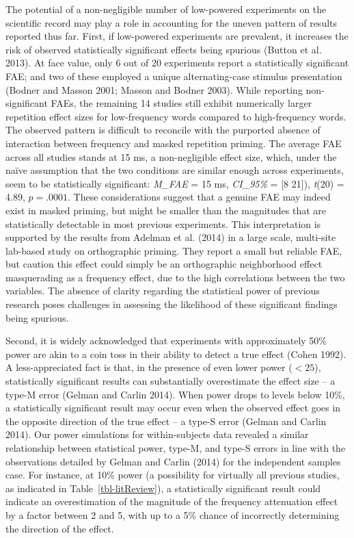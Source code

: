 \documentclass[
]{interact}
\begin{document}
The potential of a non-negligible number of low-powered experiments on
the scientific record may play a role in accounting for the uneven
pattern of results reported thus far. First, if low-powered experiments
are prevalent, it increases the risk of observed statistically
significant effects being spurious (Button et al. 2013). At face value,
only 6 out of 20 experiments report a statistically significant FAE; and
two of these employed a unique alternating-case stimulus presentation
(Bodner and Masson 2001; Masson and Bodner 2003). While reporting
non-significant FAEs, the remaining 14 studies still exhibit numerically
larger repetition effect sizes for low-frequency words compared to
high-frequency words. The observed pattern is difficult to reconcile
with the purported absence of interaction between frequency and masked
repetition priming. The average FAE across all studies stands at 15 ms,
a non-negligible effect size, which, under the naïve assumption that the
two conditions are similar enough across experiments, seem to be
statistically significant: \emph{M\_FAE} = 15 ms, \emph{CI\_95\%} = {[}8
21{]}), \emph{t}(20) = 4.89, \(p=.0001\). These considerations suggest
that a genuine FAE may indeed exist in masked priming, but might be
smaller than the magnitudes that are statistically detectable in most
previous experiments. This interpretation is supported by the results
from Adelman et al. (2014) in a large scale, multi-site lab-based study
on orthographic priming. They report a small but reliable FAE, but
caution this effect could simply be an orthographic neighborhood effect
masquerading as a frequency effect, due to the high correlations between
the two variables. The absence of clarity regarding the statistical
power of previous research poses challenges in assessing the likelihood
of these significant findings being spurious.

Second, it is widely acknowledged that experiments with approximately
50\% power are akin to a coin toss in their ability to detect a true
effect (Cohen 1992). A less-appreciated fact is that, in the presence of
even lower power (\(<25%
\)), statistically significant results can substantially overestimate
the effect size -- a type-M error (Gelman and Carlin 2014). When power
drops to levels below 10\%, a statistically significant result may occur
even when the observed effect goes in the opposite direction of the true
effect -- a type-S error (Gelman and Carlin 2014). Our power simulations
for within-subjects data revealed a similar relationship between
statistical power, type-M, and type-S errors in line with the
observations detailed by Gelman and Carlin (2014) for the independent
samples case. For instance, at 10\% power (a possibility for virtually
all previous studies, as indicated in Table~\ref{tbl-litReview}), a
statistically significant result could indicate an overestimation of the
magnitude of the frequency attenuation effect by a factor between 2 and
5, with up to a 5\% chance of incorrectly determining the direction of
the effect.
\end{document}
